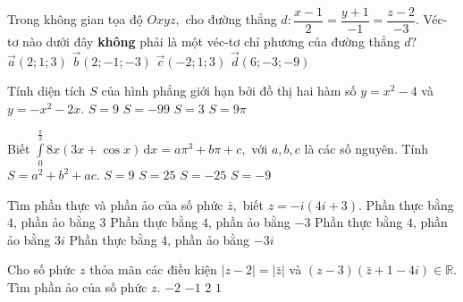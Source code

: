 \begin{ex}%
Trong không gian tọa độ $Oxyz,$ cho đường thẳng $d\colon \dfrac{x-1}2=\dfrac{y+1}{-1}=\dfrac{z-2}{-3}.$ Véc-tơ nào dưới đây {\bf không} phải là một véc-tơ chỉ phương của đường thẳng $d?$
\choice
{\True $\vec{a}(2;1;3)$}
{$\vec{b}(2;-1;-3)$}
{$\vec{c}(-2;1;3)$}
{$\vec{d}(6;-3;-9)$}
\end{ex}

\begin{ex}%
Tính diện tích $S$ của hình phẳng giới hạn bởi đồ thị hai hàm số $y=x^2-4$ và $y=-x^2-2x.$
\choice
{\True $S=9$}
{$S=-99$}
{$S=3$}
{$S=9\pi$}
\end{ex}

\begin{ex}%
Biết $\displaystyle \int\limits_0^\frac{\pi}2 8x(3x+\cos x)\mathrm{\,d}x=a\pi^3+b\pi+c,$ với $a, b, c$ là các số nguyên. Tính $S=a^2+b^2+ac.$
\choice
{\True $S=9$}
{$S=25$}
{$S=-25$}
{$S=-9$}
\end{ex}

\begin{ex}%
Tìm phần thực và phần ảo của số phức $\bar z,$ biết $z=-i(4i+3).$
\choice
{\True Phần thực bằng $4$, phần ảo bằng $3$}
{Phần thực bằng $4$, phần ảo bằng $-3$}
{Phần thực bằng $4$, phần ảo bằng $3i$}
{Phần thực bằng $4$, phần ảo bằng $-3i$}
\end{ex}

\begin{ex}%
Cho số phức $z$ thỏa mãn các điều kiện $|z-2|=|\bar z|$ và $(z-3)(\bar{z}+1-4i)\in \mathbb{R}.$ Tìm phần ảo của số phức $z$.
\choice
{\True $-2$}
{$-1$}
{$2$}
{$1$}
\end{ex}

